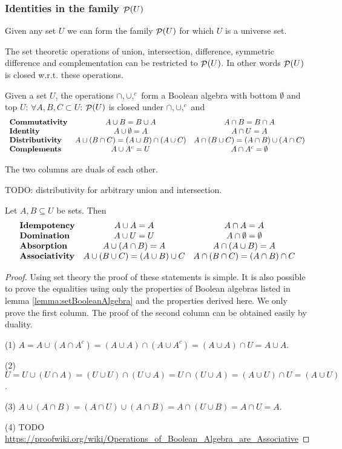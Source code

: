 \subsubsection{Identities in the family $\mathop{\mathcal{P}}(U)$}
Given any set $U$ we can form the family $\mathop{\mathcal{P}}(U)$ for which $U$ is a universe set.

The set theoretic operations of union, intersection, difference, symmetric difference and complementation can be restricted to $\mathop{\mathcal{P}}(U)$. In other words $\mathop{\mathcal{P}}(U)$ is closed w.r.t. these operations.

\begin{proposition} \label{lemma:setBooleanAlgebra}
Given a set $U$, the operations $\cap, \cup, ^c$ form a Boolean algebra with bottom $\emptyset$ and top $U$: $\forall A,B,C\subset U$: $\mathop{\mathcal{P}}(U)$ is closed under $\cap, \cup, ^c$ and
\[ \begin{array}{l c c}
\text{\textbf{Commutativity}} & A\cup B= B\cup A & A\cap B = B\cap A \\
\text{\textbf{Identity}} & A\cup\emptyset = A & A\cap U = A \\
\text{\textbf{Distributivity}} & A\cup(B\cap C) = (A\cup B)\cap(A\cup C) & A\cap(B\cup C) = (A\cap B)\cup(A\cap C) \\
\text{\textbf{Complements}} & A\cup A^c = U & A\cap A^c = \emptyset
\end{array} \]
\end{proposition}
The two columns are duals of each other.

TODO: distributivity for arbitrary union and intersection.

\begin{corollary} \label{lemma:BooleanConsequences}
Let $A,B\subseteq U$ be sets. Then
\[ \begin{array}{l c c}
\text{\textbf{Idempotency}} & A\cup A = A & A\cap A = A \\
\text{\textbf{Domination}} & A\cup U = U & A\cap \emptyset = \emptyset \\
\text{\textbf{Absorption}} & A\cup(A\cap B) = A & A\cap(A\cup B) = A \\
\text{\textbf{Associativity}} & A\cup(B\cup C) = (A\cup B)\cup C & A\cap(B\cap C) = (A\cap B)\cap C
\end{array} \]
\end{corollary}
\begin{proof}
Using set theory the proof of these statements is simple. It is also possible to prove the equalities using only the properties of Boolean algebras listed in lemma \ref{lemma:setBooleanAlgebra} and the properties derived here. We only prove the first column. The proof of the second column can be obtained easily by duality.

(1) $A = A\cup(A\cap A^c) = (A\cup A)\cap (A\cup A^c) = (A\cup A)\cap U = A\cup A$.

(2) $U = U\cup (U\cap A) = (U\cup U)\cap (U\cup A) = U\cap (U\cup A) = (A\cup U)\cap U = (A\cup U)$.

(3) $A\cup(A\cap B) = (A\cap U)\cup(A\cap B) = A\cap(U\cup B) = A\cap U = A$.

(4) TODO \url{https://proofwiki.org/wiki/Operations_of_Boolean_Algebra_are_Associative}
\end{proof}


